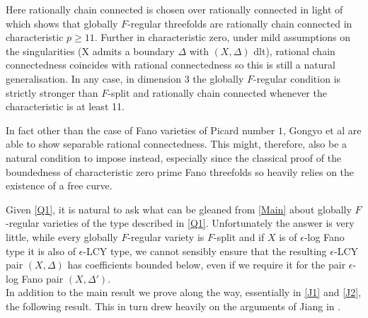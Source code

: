 \documentclass[a4paper,12pt]{book}
\newcommand{\D}{\Delta}
\begin{document}
	\begin{remark}
		Here rationally chain connected is chosen over rationally connected in light of \cite{gongyo2015rational} which shows that globally $F$-regular threefolds are rationally chain connected in characteristic $p\geq 11$. Further in characteristic zero, under mild assumptions on the singularities (X admits a boundary $\D$ with $(X,\D)$ dlt), rational chain connectedness coincides with rational connectedness so this is still a natural generalisation. In any case, in dimension $3$ the globally $F$-regular condition is strictly stronger than $F$-split and rationally chain connected whenever the characteristic is at least 11. 
		
		In fact other than the case of Fano varieties of Picard number $1$, Gongyo et al are able to show separable rational connectedness. This might, therefore, also be a natural condition to impose instead, especially since the classical proof of the boundedness of characteristic zero prime Fano threefolds so heavily relies on the existence of a free curve. 
	\end{remark}
	
	Given \autoref{Q1}, it is natural to ask what can be gleaned from \autoref{Main} about globally $F$-regular varieties of the type described in \autoref{Q1}. Unfortunately the answer is very little, while every globally $F$-regular variety is $F$-split and if $X$ is of $\epsilon$-log Fano type it is also of $\epsilon$-LCY type, we cannot sensibly ensure that the resulting $\epsilon$-LCY pair $(X,\Delta)$ has coefficients bounded below, even if we require it for the pair $\epsilon$-log Fano pair $(X,\Delta')$.\\
	
	In addition to the main result we prove along the way, essentially in \autoref{J1} and \autoref{J2}, the following result. This in turn drew heavily on the arguments of Jiang in \cite{jiang2014boundedness}.
	
\end{document}
